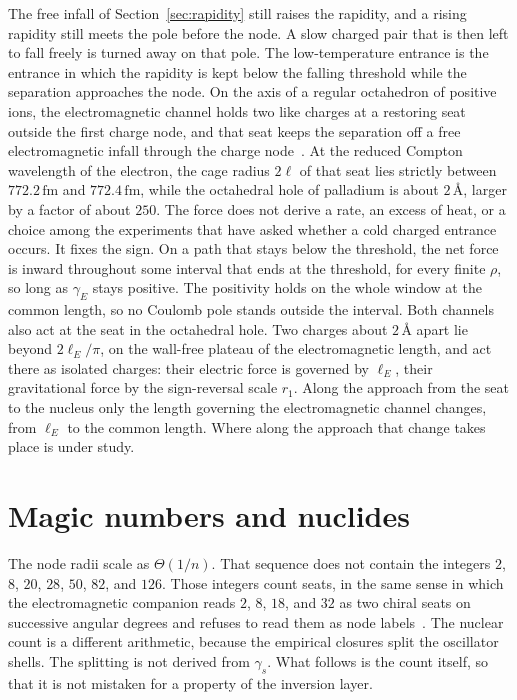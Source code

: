 \documentclass[a4paper]{article}
\begin{document}
The free infall of Section~\ref{sec:rapidity} still raises the rapidity, and a rising rapidity still meets the pole before the node. A slow charged pair that is then left to fall freely is turned away on that pole. The low-temperature entrance is the entrance in which the rapidity is kept below the falling threshold while the separation approaches the node. On the axis of a regular octahedron of positive ions, the electromagnetic channel holds two like charges at a restoring seat outside the first charge node, and that seat keeps the separation off a free electromagnetic infall through the charge node~\cite{dst-cold}. At the reduced Compton wavelength of the electron, the cage radius \(2\ell\) of that seat lies strictly between \(772.2\,\mathrm{fm}\) and \(772.4\,\mathrm{fm}\), while the octahedral hole of palladium is about \(2\,\text{\AA}\), larger by a factor of about \(250\). The force does not derive a rate, an excess of heat, or a choice among the experiments that have asked whether a cold charged entrance occurs. It fixes the sign. On a path that stays below the threshold, the net force is inward throughout some interval that ends at the threshold, for every finite \(\rho\), so long as \(\gamma_E\) stays positive. The positivity holds on the whole window at the common length, so no Coulomb pole stands outside the interval. Both channels also act at the seat in the octahedral hole. Two charges about \(2\,\text{\AA}\) apart lie beyond \(2\ell_E/\pi\), on the wall-free plateau of the electromagnetic length, and act there as isolated charges: their electric force is governed by \(\ell_E\), their gravitational force by the sign-reversal scale \(r_1\). Along the approach from the seat to the nucleus only the length governing the electromagnetic channel changes, from \(\ell_E\) to the common length. Where along the approach that change takes place is under study.

\section{Magic numbers and nuclides}
\label{sec:magic}

The node radii scale as \(\Theta(1/n)\). That sequence does not contain the integers \(2\), \(8\), \(20\), \(28\), \(50\), \(82\), and \(126\). Those integers count seats, in the same sense in which the electromagnetic companion reads \(2\), \(8\), \(18\), and \(32\) as two chiral seats on successive angular degrees and refuses to read them as node labels~\cite{dst-shell}. The nuclear count is a different arithmetic, because the empirical closures split the oscillator shells. The splitting is not derived from \(\gamma_s\). What follows is the count itself, so that it is not mistaken for a property of the inversion layer.
\end{document}
